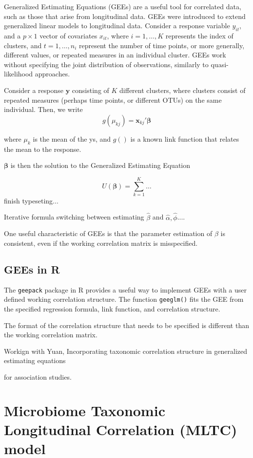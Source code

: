 \documentclass[12pt]{article}
\begin{document}
Generalized Estimating Equations (GEEs) are a useful tool for correlated data, such as those that arise from longitudinal data. GEEs were introduced to extend generalized linear models to longitudinal data. \cite{liang1986longitudinal} Consider a response variable $y_{it}$, and a $p \times 1$ vector of covariates $x_{it}$, where $i = 1, \ldots , K$ represents the index of clusters, and $t = 1, \ldots , n_i$ represent the number of time points, or more generally, different values, or repeated measures in an individual cluster. GEEs work without specifying the joint distribution of observations, similarly to quasi-likelihood approaches.

Consider a response $\mathbf{y}$ consisting of $K$ different clusters, where clusters consist of repeated measures (perhaps time points, or different OTUs) on the same individual. Then, we write
$$g(\mu_{kj}) = \mathbf{x}_{kj}'\boldsymbol \beta$$

where $\mu_{k}$ is the mean of the ys, and $g()$ is a known link function that relates the mean to the response.

$\boldsymbol\beta$ is then the solution to the Generalized Estimating Equation

$$U(\boldsymbol\beta) = \sum_{k = 1}^K \ldots $$
finish typeseting...

Iterative formula switching between estimating $\hat\beta$ and $\hat \alpha, \hat \phi$....

One useful characteristic of GEEs is that the parameter estimation of $\beta$ is consistent, even if the working correlation matrix is misspecified.

\subsection{GEEs in R}

The \texttt{geepack} package\cite{geepack} in R \cite{R} provides a useful way to implement GEEs with a user defined working correlation structure. The function \texttt{geeglm()} fits the GEE from the specified regression formula, link function, and correlation structure.

The format of the correlation structure that needs to be specified is different than the working correlation matrix.

Workign with Yuan,
Incorporating taxonomic correlation structure in generalized estimating equations


 for association studies.

\section{Microbiome Taxonomic Longitudinal Correlation (MLTC) model}
\end{document}

